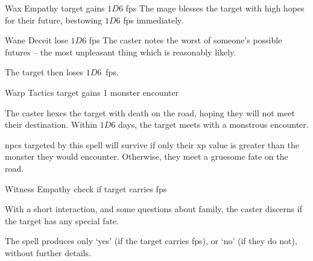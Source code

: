   {\mFate}%
  {Wax}%
  {}%
  {Empathy}%
  {target gains $1D6$ \glspl{fp}}%
  {
    The mage blesses the target with high hopes for their future, bestowing $1D6$ \glspl{fp} immediately.
  }

  {\mFate}%
  {Wane}%
  {}%
  {Deceit}%
  {lose $1D6$ \glspl{fp}}%
  {
    The caster notes the worst of someone's possible futures -- the most unpleasant thing which is reasonably likely.
  }

The target then loses $1D6$~\glspl{fp}.

  {\mFate}%
  {Warp}%
  {}%
  {Tactics}%
  {target gains 1 monster encounter}%
  {
    The caster hexes the target with death on the road, hoping they will not meet their destination.
    Within $1D6$ days, the target meets with a monstrous encounter.%

    \Glspl{npc} targeted by this spell will survive if only their \gls{xp} value is greater than the monster they would encounter.
    Otherwise, they meet a gruesome fate on the road.
  }

  {\mFate}%
  {Witness}%
  {}%
  {Empathy}%
  {check if target carries \glspl{fp}}%
  {
    With a short interaction, and some questions about family, the caster discerns if the target has any special fate.

    The spell produces only `yes' (if the target carries \glspl{fp}), or `no' (if they do not), without further details.
  }

